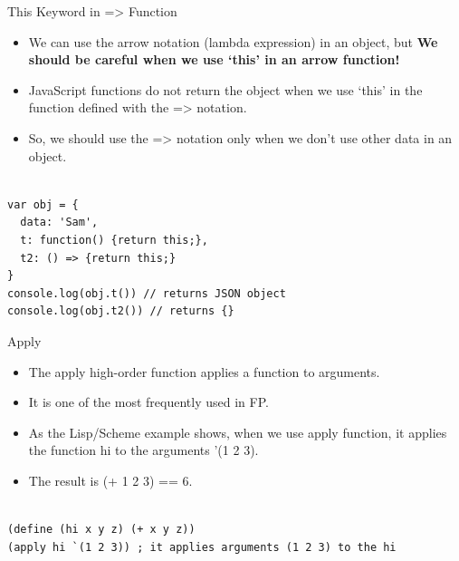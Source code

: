 \begin{frame}[fragile]{This Keyword in => Function}

\begin{itemize}
  \item We can use the arrow notation (lambda expression) in an object, but \textbf{We should be careful when we use `this' in an arrow function!}
	\item JavaScript functions do not return the object when we use `this' in the function defined with the => notation. 
	\item So, we should use the => notation only when we don't use other data in an object. 
\end{itemize}

\begin{Code}{}%
\begin{lstlisting}[firstnumber=1, label=glabels, xleftmargin=0pt, basicstyle=\tiny]% 

var obj = {
  data: 'Sam',
  t: function() {return this;},  
  t2: () => {return this;}
}
console.log(obj.t()) // returns JSON object
console.log(obj.t2()) // returns {}
\end{lstlisting}%
\end{Code}%

\end{frame}


\begin{frame}[fragile]{Apply}

\begin{itemize}
	\item The apply high-order function applies a function to arguments. 
	\item It is one of the most frequently used in FP.
	\item As the Lisp/Scheme example shows, when we use apply function, it applies the function hi to the arguments '(1 2 3). 
	\item The result is (+ 1 2 3) == 6.  
\end{itemize}

\begin{Code}{}%
\begin{lstlisting}[firstnumber=1, label=glabels, xleftmargin=0pt, basicstyle=\scriptsize]% 

(define (hi x y z) (+ x y z))
(apply hi `(1 2 3)) ; it applies arguments (1 2 3) to the hi
\end{lstlisting}%
\end{Code}%

\end{frame}

